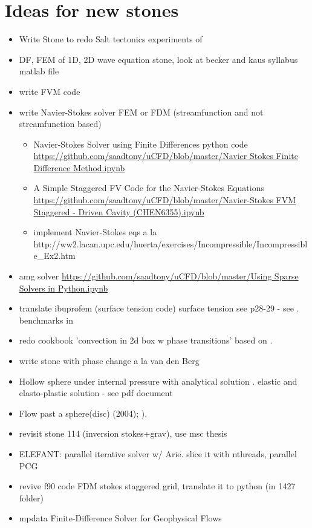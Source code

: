 \documentclass[a4paper]{article}
\begin{document}
\newpage
\section{Ideas for new stones}

\begin{itemize}
\item Write Stone to redo Salt tectonics experiments of \cite{dacl94}
\item DF, FEM of 1D, 2D wave equation stone, look at becker and kaus syllabus matlab file
\item write FVM code
\item write Navier-Stokes solver FEM or FDM (streamfunction and not streamfunction based)\\
\begin{itemize}
\item Navier-Stokes Solver using Finite Differences python code 
\url{https://github.com/saadtony/uCFD/blob/master/Navier Stokes Finite Difference Method.ipynb}
\item A Simple Staggered FV Code for the Navier-Stokes Equations
\url{https://github.com/saadtony/uCFD/blob/master/Navier-Stokes FVM Staggered - Driven Cavity (CHEN6355).ipynb}
\item implement Navier-Stokes eqs a la http://ww2.lacan.upc.edu/huerta/exercises/Incompressible/Incompressible\_Ex2.htm
\end{itemize}

\item amg solver
\url{https://github.com/saadtony/uCFD/blob/master/Using Sparse Solvers in Python.ipynb}

\item translate ibuprofem (surface tension code) surface tension see \cite{reddybook2}p28-29 - 
see \cite{dett04}. benchmarks in \cite{chcc12} 
\item redo  cookbook 'convection in 2d box w phase transitions' based on \textcite{chyu85}. 
\item write stone with phase change a la van den Berg \textcite{vava08}
\item Hollow sphere under internal pressure with analytical solution
. elastic and elasto-plastic solution  - see pdf document
\item Flow past a sphere(disc) \textcite{demj04} (2004); 
      \textcite{gafp17}). 
\item revisit stone 114 (inversion stokes+grav), use msc thesis 
\item ELEFANT:  parallel iterative solver w/ Arie. slice it with nthreads, parallel PCG
\item revive f90 code FDM stokes staggered grid, translate it to python 
(in 1427 folder)
\item mpdata Finite-Difference Solver for Geophysical Flows \cite{smma98}
\end{itemize}
\end{document}
